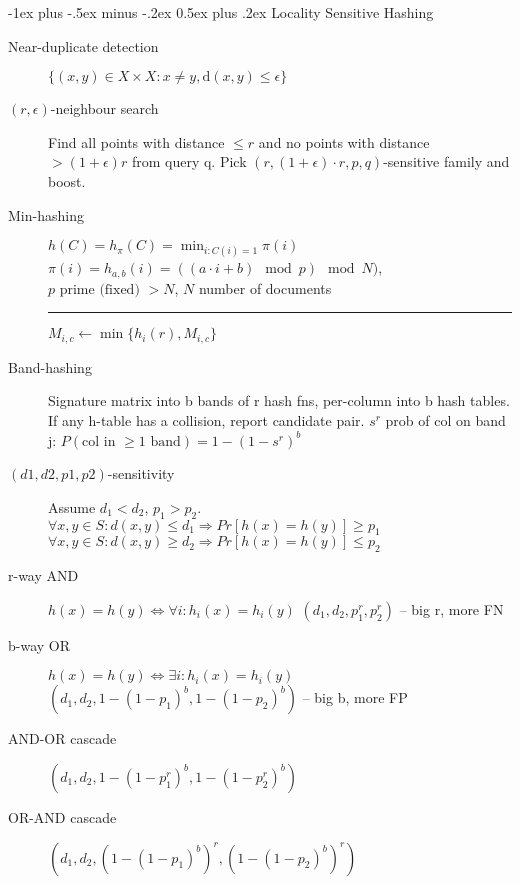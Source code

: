 \documentclass[11pt,landscape]{article}
\makeatletter
\renewcommand{\section}{\@startsection{section}{1}{0mm}%
                                {-1ex plus -.5ex minus -.2ex}%
                                {0.5ex plus .2ex}%
                                {\color{sectionColor}\normalfont\normalsize\bfseries}}
\makeatother
\begin{document}
\begin{multicols}{3}
\section{Locality Sensitive Hashing}
    \begin{description}
        \item[Near-duplicate detection] $ \{ (x,y) \in X \times X : x \neq y, \text{d}(x,y) \leq \epsilon \}$
        \item[$(r,\epsilon)$-neighbour search]
        Find all points with distance $\leq r$ and no points with distance $> (1+ \epsilon)r$ from query q.
        Pick $(r,(1+\epsilon) \cdot r,p,q)$-sensitive family and boost.
        \item[Min-hashing] $h(C) = h_{\pi}(C) = \min_{i : C(i) = 1} \pi(i)$
            \subitem $\pi(i) = h_{a, b}(i) = ((a \cdot i + b) \mod p) \mod N)$,
        $p \text{ prime (fixed) } > N$, $N$ number of documents
            \hrule
            \begin{algorithmic}[1]
                \State $M_{i,c} \gets \min\{h_i(r), M_{i,c}\}$
            \EndFor
        \EndIf
    \EndFor
\EndFor
\end{algorithmic}
        \item[Band-hashing] Signature matrix into b bands of r hash fns,
            per-column into b hash tables. If any h-table has a collision,
            report candidate pair. $s^r$ prob of col on band j: $P(\text{col in } \geq 1 \text{ band}) = 1-(1-s^r)^b$
        \item[$(d1,d2,p1,p2)$-sensitivity] Assume $d_1<d_2$, $p_1>p_2$.
                $\forall x,y \in S: d(x,y) \leq d_1 \Rightarrow Pr[h(x)=h(y)] \geq p_1$\\
                $\forall x,y \in S: d(x,y) \geq d_2 \Rightarrow Pr[h(x)=h(y)] \leq p_2$
        \item[r-way AND] $h(x)=h(y) \iff \forall i : h_i(x)=h_i(y)$
            $(d_1,d_2,p_1^r,p_2^r)$ -- big r, more FN
        \item[b-way OR] $h(x)=h(y) \iff \exists i : h_i(x)=h_i(y)$
            $(d_1,d_2,1-(1-p_1)^b,1-(1-p_2)^b)$ -- big b, more FP
        \item[AND-OR cascade] $(d_1,d_2,1-(1-p_1^r)^b,1-(1-p_2^r)^b)$
        \item[OR-AND cascade] $(d_1,d_2,(1-(1-p_1)^b)^r,(1-(1-p_2)^b)^r)$
    \end{description}

\end{multicols}
\end{document}

